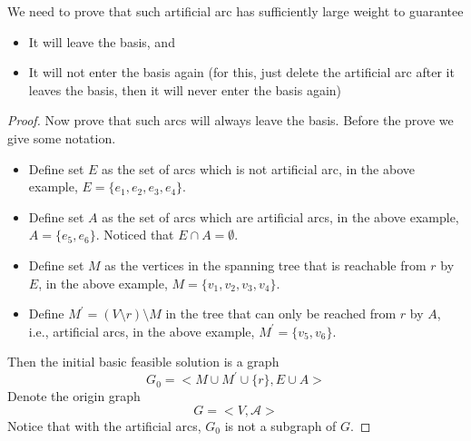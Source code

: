                     We need to prove that such artificial arc has sufficiently large weight to guarantee

                    \begin{itemize}
                        \item It will leave the basis, and
                        \item It will not enter the basis again (for this, just delete the artificial arc after it leaves the basis, then it will never enter the basis again)
                    \end{itemize}

                    \begin{proof}
                        Now prove that such arcs will always leave the basis. Before the prove we give some notation. 
                        \begin{itemize}
                            \item Define set $E$ as the set of arcs which is not artificial arc, in the above example, $E = \{e_1, e_2, e_3, e_4\}$. 
                            \item Define set $A$ as the set of arcs which are artificial arcs, in the above example, $A = \{e_5, e_6\}$. Noticed that $E \cap A = \emptyset$.
                            \item Define set $M$ as the vertices in the spanning tree that is reachable from $r$ by $E$, in the above example, $M = \{v_1, v_2, v_3, v_4\}$.
                            \item Define $M^\prime = (V\setminus r) \setminus M$ in the tree that can only be reached from $r$ by $A$, i.e., artificial arcs, in the above example, $M^\prime = \{v_5, v_6\}$. 
                        \end{itemize}

                        Then the initial basic feasible solution is a graph 
                        \begin{equation*}
                            G_0 = <M\cup M^\prime \cup \{r\}, E\cup A>
                        \end{equation*}
                        Denote the origin graph 
                        \begin{equation*}
                            G = <V, \mathcal{A}>
                        \end{equation*}
                        Notice that with the artificial arcs, $G_0$ is not a subgraph of $G$.


\end{proof}
